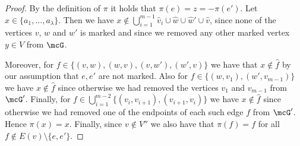 \documentclass[a4paper,UKenglish]{lipics}
\theoremstyle{plain}
\begin{document}
\begin{proof}
By the definition of $\pi$ it holds that $\pi(e) = z = - \pi(e')$. 
Let $x \in \{ a_1, \dots, a_\lambda\}$. Then we have $x \nin 
\bigcup_{i=1}^{m-1} \hat v_i \cup \hat w \cup \hat w' \cup 
\hat v$, since none of the vertices $v$, $w$ and
$w'$ is marked and since we removed any other marked vertex $y \in V$ 
from $\mcG$.

Moreover, for $f \in \{ (v,w), (w,v), (v,w'), (w',v) \}$ we have 
that $x \nin \hat f$ by our assumption that $e, e'$ are not marked.
Also for $f \in \{ (w, v_1), (w',v_{m-1}) \}$ we have $x \nin \hat f$ since 
otherwise we had removed the vertices $v_1$ and $v_{m-1}$ from $\mcG'$.
Finally, for
$f \in \bigcup_{i=1}^{m-2} \{ (v_i, v_{i+1}), (v_{i+1}, v_{i}) \}$ 
we have $x \nin \hat f$
since otherwise we had removed one of the endpoints of each such edge $f$ from 
$\mcG'$. Hence $\pi(x)=x$. 
Finally, since $v \nin V''$ we also have that $\pi(f) = f$ 
for all $f \nin E(v) \setminus \{e, e'\}$.
\end{proof}
\end{document}
